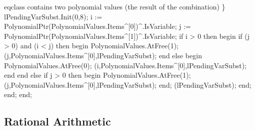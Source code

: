               eqclass contains two polynomial values (the result of
              the combination) \}
            lPendingVarSubst.Init(0,8);
            i := PolynomialPtr(PolynomialValues.Items^[0])^.IsVariable;
            j := PolynomialPtr(PolynomialValues.Items^[1])^.IsVariable;
            if i > 0 then
            begin
               if (j > 0) and (i < j) then
               begin
                  PolynomialValues.AtFree(1);
                  (j,PolynomialValues.Items^[0],lPendingVarSubst);
               end
               else
               begin
                  PolynomialValues.AtFree(0);
                  (i,PolynomialValues.Items^[0],lPendingVarSubst);
               end
            end
            else if j > 0 then
            begin
               PolynomialValues.AtFree(1);
               (j,PolynomialValues.Items^[0],lPendingVarSubst);
            end;
            (lPendingVarSubst);
         end;
   end;
end;
\eatline
{}\nwendcode{}\nwdocspar
\subsection{Rational Arithmetic}

